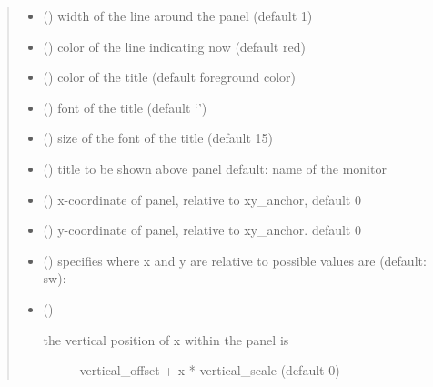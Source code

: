 \documentclass[letterpaper,10pt,english]{sphinxmanual}
\begin{document}
\begin{fulllineitems}
\begin{fulllineitems}
\begin{quote}
\begin{description}
\begin{itemize}
\item {} 
 () \textendash{} width of the line around the panel (default 1)

\item {} 
 () \textendash{} color of the line indicating now (default red)

\item {} 
 () \textendash{} color of the title (default foreground color)

\item {} 
 () \textendash{} font of the title (default ‘’)

\item {} 
 () \textendash{} size of the font of the title (default 15)

\item {} 
 () \textendash{} title to be shown above panel 
default: name of the monitor

\item {} 
 () \textendash{} x-coordinate of panel, relative to xy\_anchor, default 0

\item {} 
 () \textendash{} y-coordinate of panel, relative to xy\_anchor. default 0

\item {} 
 () \textendash{} specifies where x and y are relative to 
possible values are (default: sw): 

\item {} 
 () \textendash{} \begin{description}
\item[{the vertical position of x within the panel is}] \leavevmode
vertical\_offset + x * vertical\_scale (default 0)


\end{description}
\end{itemize}
\end{description}
\end{quote}
\end{fulllineitems}
\end{fulllineitems}
\end{document}
